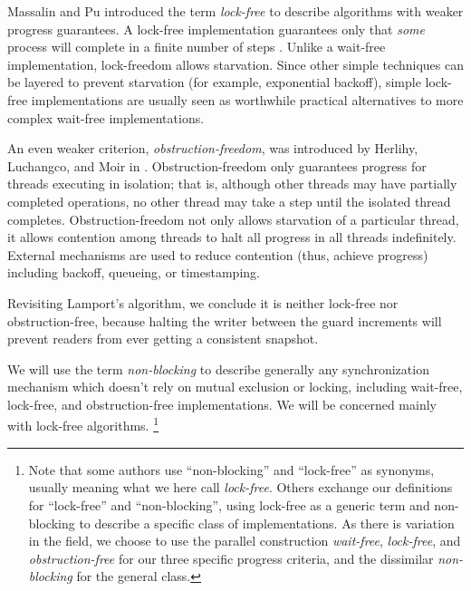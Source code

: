\documentclass[preprint]{rdbacmconf}
\begin{document}
Massalin and Pu introduced the term \emph{lock-free} to describe 
algorithms with weaker progress guarantees.
A lock-free implementation guarantees only that \emph{some}
process will complete in a finite number of steps
\cite{MassalinPu91}.  Unlike a wait-free implementation,
lock-freedom allows starvation.  Since other simple techniques can be
layered to prevent starvation (for example, exponential backoff),
simple lock-free implementations are usually seen as worthwhile practical
alternatives to more complex wait-free implementations.

An even weaker criterion, \emph{obstruction-freedom}, was introduced
by Herlihy, Luchangco, and Moir in \cite{HerlihyLuMo03}.
Obstruction-freedom only guarantees progress for threads executing in
isolation; that is, although other threads may have partially
completed operations, no other thread may take a step until the
isolated thread completes.  Obstruction-freedom not only allows
starvation of a particular thread, it allows contention among threads
to halt all progress in all threads
indefinitely.  External mechanisms are used to reduce contention
(thus, achieve progress) including backoff, queueing, or timestamping.

Revisiting Lamport's algorithm, we conclude it is neither lock-free
nor obstruction-free,
because halting the writer between the guard increments will prevent
readers from ever getting a consistent snapshot.

We will use the term \emph{non-blocking} to describe
generally any synchronization mechanism which doesn't rely on mutual
exclusion or locking, including wait-free, lock-free,
and obstruction-free implementations.
We will be concerned mainly with lock-free algorithms.%
\footnote{Note that some authors use ``non-blocking'' and
  ``lock-free'' as synonyms, usually meaning what we here call
  \emph{lock-free}.  Others exchange our definitions for ``lock-free''
  and ``non-blocking'', using lock-free as a generic term and non-blocking
  to describe a specific class of implementations.  As there is
  variation in the field, we choose to use the parallel construction
  \emph{wait-free}, \emph{lock-free}, and \emph{obstruction-free} for
  our three specific progress criteria, and the dissimilar
  \emph{non-blocking} for the general class.}
\end{document}
